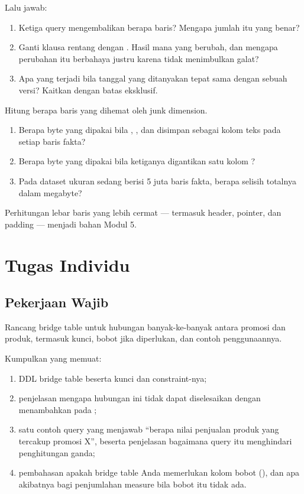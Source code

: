 Lalu jawab:

\begin{enumerate}[leftmargin=1.4em]
  \item Ketiga query mengembalikan berapa baris? Mengapa jumlah itu yang benar?
  \item Ganti klausa rentang dengan . Hasil mana yang
        berubah, dan mengapa perubahan itu berbahaya justru karena tidak
        menimbulkan galat?
  \item Apa yang terjadi bila tanggal yang ditanyakan tepat sama dengan
         sebuah versi? Kaitkan dengan batas
        eksklusif.
\end{enumerate}


Hitung berapa baris yang dihemat oleh junk dimension.

\begin{enumerate}[leftmargin=1.4em]
  \item Berapa byte yang dipakai bila ,
        , dan  disimpan sebagai kolom
        teks pada setiap baris fakta?
  \item Berapa byte yang dipakai bila ketiganya digantikan satu kolom
        ?
  \item Pada dataset ukuran sedang berisi 5 juta baris fakta, berapa selisih
        totalnya dalam megabyte?
\end{enumerate}

Perhitungan lebar baris yang lebih cermat --- termasuk header, pointer, dan
padding --- menjadi bahan Modul 5.

\section{Tugas Individu}

\subsection{Pekerjaan Wajib}
Rancang bridge table untuk hubungan banyak-ke-banyak antara promosi dan produk,
termasuk kunci, bobot jika diperlukan, dan contoh penggunaannya.

Kumpulkan  yang memuat:

\begin{enumerate}[leftmargin=1.4em]
  \item DDL bridge table beserta kunci dan constraint-nya;
  \item penjelasan mengapa hubungan ini tidak dapat diselesaikan dengan
        menambahkan  pada ;
  \item satu contoh query yang menjawab ``berapa nilai penjualan produk yang
        tercakup promosi X'', beserta penjelasan bagaimana query itu menghindari
        penghitungan ganda;
  \item pembahasan apakah bridge table Anda memerlukan kolom bobot
        (), dan apa akibatnya bagi penjumlahan
        measure bila bobot itu tidak ada.
\end{enumerate}

